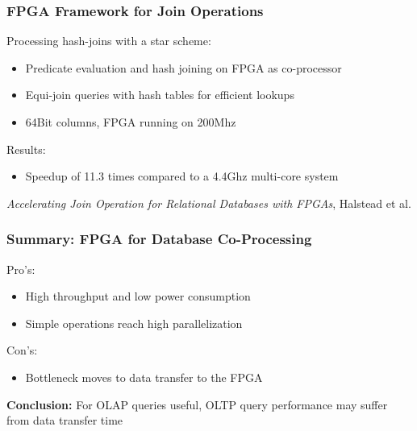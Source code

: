 \documentclass{beamer}
\begin{document}

\begin{frame}
	\frametitle{FPGA Framework for Join Operations}
	Processing hash-joins with a star scheme:
	\begin{itemize}
		\item Predicate evaluation and hash joining on FPGA as co-processor
		\item Equi-join queries with hash tables for efficient lookups
		\item 64Bit columns, FPGA running on 200Mhz 
	\end{itemize}
	Results:
	\begin{itemize}
		\item Speedup of 11.3 times compared to a 4.4Ghz multi-core system
	\end{itemize}
	\begin{center}
		\small \emph{Accelerating Join Operation for Relational Databases with FPGAs}, Halstead et al.
	\end{center}
\end{frame}

\begin{frame}
\frametitle{Summary: FPGA for Database Co-Processing}
Pro's:
\begin{itemize}
	\item High throughput and low power consumption
	\item Simple operations reach high parallelization
\end{itemize}
\vspace*{0.3cm}
Con's:
\begin{itemize}
	\item Bottleneck moves to data transfer to the FPGA
\end{itemize}
\vspace*{0.3cm}
\textbf{Conclusion:} For OLAP queries useful, OLTP query performance may suffer from data transfer time

\end{frame}
\end{document}
